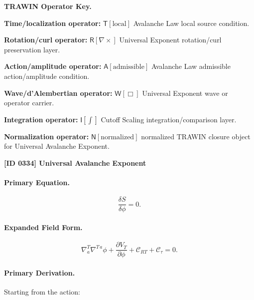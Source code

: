 \par\vspace{0.45\baselineskip}
\noindent\begin{minipage}[t]{\linewidth}
\begingroup
\small
\raggedright
\textbf{TRAWIN Operator Key.}\par
\noindent\textbf{Time/localization operator:} $\mathsf{T}\!\left[\mathrm{local}\right]$ Avalanche Law local source condition.\par
\noindent\textbf{Rotation/curl operator:} $\mathsf{R}\!\left[\nabla\times\right]$ Universal Exponent rotation/curl preservation layer.\par
\noindent\textbf{Action/amplitude operator:} $\mathsf{A}\!\left[\mathrm{admissible}\right]$ Avalanche Law admissible action/amplitude condition.\par
\noindent\textbf{Wave/d'Alembertian operator:} $\mathsf{W}\!\left[\Box\right]$ Universal Exponent wave or operator carrier.\par
\noindent\textbf{Integration operator:} $\mathsf{I}\!\left[\int\right]$ Cutoff Scaling integration/comparison layer.\par
\noindent\textbf{Normalization operator:} $\mathsf{N}\!\left[\mathrm{normalized}\right]$ normalized TRAWIN closure object for Universal Avalanche Exponent.\par
\endgroup
\end{minipage}

\clearpage
\noindent\textbf{[ID 0334] Universal Avalanche Exponent}\par
\vspace{0.35em}
\paragraph{Primary Equation.}
\begin{equation}
\frac{\delta S}{\delta \phi}=0 .
\end{equation}

\paragraph{Expanded Field Form.}
\begin{equation}
\nabla^T_a\nabla^{T\,a}\phi
+
\frac{\partial V_T}{\partial \phi}
+
\mathcal{C}_{RT}
+
\mathcal{C}_{\tau}
=
0 .
\end{equation}

\paragraph{Primary Derivation.}
Starting from the action:

